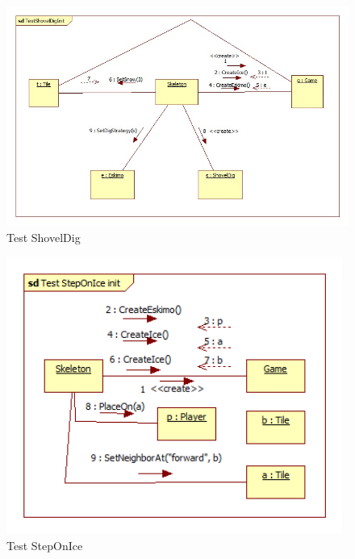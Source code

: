 \begin{figure}[H]
	\begin{center}
		\includegraphics[width=17cm]{chapters/chapter05/diagrams/TestShovelDigInit.jpg}
		\caption{Test ShovelDig}
		\label{fig:Test ShovelDig}
	\end{center}
\end{figure}

\begin{figure}[H]
	\begin{center}
		\includegraphics[width=11cm]{chapters/chapter05/diagrams/Test_StepOnIce_init.png}
		\caption{Test StepOnIce}
		\label{fig:Test StepOnIce}
	\end{center}
\end{figure}

